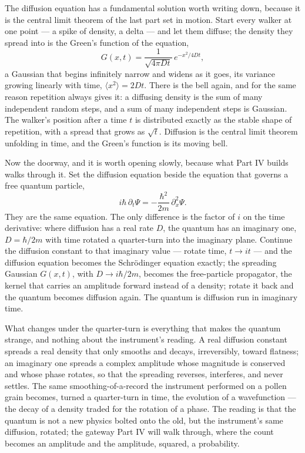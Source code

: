 The diffusion equation has a fundamental solution worth writing down, because it is the central limit theorem
of the last part set in motion. Start every walker at one point --- a spike of density, a delta --- and let
them diffuse; the density they spread into is the Green's function of the equation,
\begin{equation}
  G(x, t) = \frac{1}{\sqrt{4\pi D t}}\, e^{-x^2/4Dt},
\end{equation}
a Gaussian that begins infinitely narrow and widens as it goes, its variance growing linearly with time,
$\langle x^2\rangle = 2Dt$. There is the bell again, and for the same reason repetition always gives it: a
diffusing density is the sum of many independent random steps, and a sum of many independent steps is
Gaussian. The walker's position after a time $t$ is distributed exactly as the stable shape of repetition,
with a spread that grows as $\sqrt{t}$. Diffusion is the central limit theorem unfolding in time, and the
Green's function is its moving bell.

Now the doorway, and it is worth opening slowly, because what Part IV builds walks through it.
Set the diffusion equation beside the equation that governs a free quantum particle,
\begin{equation}
  i\hbar\,\partial_t \Psi = -\frac{\hbar^2}{2m}\,\partial_x^2 \Psi .
\end{equation}
They are the same equation. The only difference is the factor of $i$ on the time derivative: where diffusion
has a real rate $D$, the quantum has an imaginary one, $D = \hbar/2m$ with time rotated a quarter-turn into
the imaginary plane. Continue the diffusion constant to that imaginary value --- rotate time, $t \to it$ ---
and the diffusion equation becomes the Schr\"odinger equation exactly; the spreading Gaussian $G(x,t)$, with
$D \to i\hbar/2m$, becomes the free-particle propagator, the kernel that carries an amplitude forward instead
of a density; rotate it back and the quantum becomes diffusion again. The quantum is diffusion run in
imaginary time.

What changes under the quarter-turn is everything that makes the quantum strange, and nothing about the
instrument's reading. A real diffusion constant spreads a real density that only smooths and decays,
irreversibly, toward flatness; an imaginary one spreads a complex amplitude whose magnitude is conserved and
whose phase rotates, so that the spreading reverses, interferes, and never settles. The same
smoothing-of-a-record the instrument performed on a pollen grain becomes, turned a quarter-turn in time, the
evolution of a wavefunction --- the decay of a density traded for the rotation of a phase. The reading is that
the quantum is not a new physics bolted onto the old, but the instrument's same diffusion, rotated;
the gateway Part IV will walk through, where the count becomes an amplitude and the amplitude, squared, a
probability.

